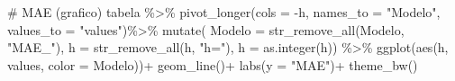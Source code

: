 \documentclass[
  letterpaper,
  DIV=11,
  numbers=noendperiod]{scrartcl}
\newenvironment{Shaded}{\begin{snugshade}}{\end{snugshade}}
\newcommand{\AttributeTok}[1]{\textcolor[rgb]{0.40,0.45,0.13}{#1}}
\newcommand{\CommentTok}[1]{\textcolor[rgb]{0.37,0.37,0.37}{#1}}
\newcommand{\FunctionTok}[1]{\textcolor[rgb]{0.28,0.35,0.67}{#1}}
\newcommand{\NormalTok}[1]{\textcolor[rgb]{0.00,0.23,0.31}{#1}}
\newcommand{\SpecialCharTok}[1]{\textcolor[rgb]{0.37,0.37,0.37}{#1}}
\newcommand{\StringTok}[1]{\textcolor[rgb]{0.13,0.47,0.30}{#1}}
\begin{document}
\begin{Shaded}
\begin{Highlighting}[]
\CommentTok{\# MAE (grafico)}
\NormalTok{tabela }\SpecialCharTok{\%\textgreater{}\%}
  \FunctionTok{pivot\_longer}\NormalTok{(}\AttributeTok{cols =} \SpecialCharTok{{-}}\NormalTok{h, }\AttributeTok{names\_to =} \StringTok{"Modelo"}\NormalTok{, }\AttributeTok{values\_to =} \StringTok{"values"}\NormalTok{)}\SpecialCharTok{\%\textgreater{}\%}
  \FunctionTok{mutate}\NormalTok{(}
    \AttributeTok{Modelo =} \FunctionTok{str\_remove\_all}\NormalTok{(Modelo, }\StringTok{"MAE\_"}\NormalTok{),}
    \AttributeTok{h =} \FunctionTok{str\_remove\_all}\NormalTok{(h, }\StringTok{"h="}\NormalTok{),}
    \AttributeTok{h =} \FunctionTok{as.integer}\NormalTok{(h)) }\SpecialCharTok{\%\textgreater{}\%}
  \FunctionTok{ggplot}\NormalTok{(}\FunctionTok{aes}\NormalTok{(h, values, }\AttributeTok{color =}\NormalTok{ Modelo))}\SpecialCharTok{+}
  \FunctionTok{geom\_line}\NormalTok{()}\SpecialCharTok{+}
  \FunctionTok{labs}\NormalTok{(}\AttributeTok{y =} \StringTok{"MAE"}\NormalTok{)}\SpecialCharTok{+}
  \FunctionTok{theme\_bw}\NormalTok{()}
\end{Highlighting}
\end{Shaded}
\end{document}
